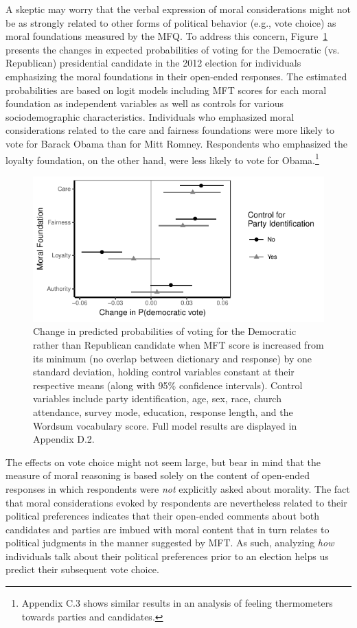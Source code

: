 \documentclass[12pt]{article}
\begin{document}
A skeptic may worry that the verbal expression of moral considerations might not be as strongly related to other forms of political behavior (e.g., vote choice) as moral foundations measured by the MFQ. To address this concern, Figure~\ref{fig:logit_vote} presents the changes in expected probabilities of voting for the Democratic (vs. Republican) presidential candidate in the 2012 election for individuals emphasizing the moral foundations in their open-ended responses. The estimated probabilities are based on logit models including MFT scores for each moral foundation as independent variables as well as controls for various sociodemographic characteristics. Individuals who emphasized moral considerations related to the care and fairness foundations were more likely to vote for Barack Obama than for Mitt Romney. Respondents who emphasized the loyalty foundation, on the other hand, were less likely to vote for Obama.\footnote{Appendix C.3 shows similar results in an analysis of feeling thermometers towards parties and candidates.}

\begin{figure}[ht]\centering
\includegraphics[scale=.9]{../calc/fig/logit_vote.pdf}
\caption{Change in predicted probabilities of voting for the Democratic rather than Republican candidate when MFT score is increased from its minimum (no overlap between dictionary and response) by one standard deviation, holding control variables constant at their respective means (along with 95\% confidence intervals). Control variables include party identification, age, sex, race, church attendance, survey mode, education, response length, and the Wordsum vocabulary score. Full model results are displayed in Appendix D.2.
}\label{fig:logit_vote}
\end{figure}

The effects on vote choice might not seem large, but bear in mind that the measure of moral reasoning is based solely on the content of open-ended responses in which respondents were \textit{not} explicitly asked about morality. The fact that moral considerations evoked by respondents are nevertheless related to their political preferences indicates that their open-ended comments about both candidates and parties are imbued with moral content that in turn relates to political judgments in the manner suggested by MFT. As such, analyzing \textit{how} individuals talk about their political preferences prior to an election helps us predict their subsequent vote choice.
\end{document}
